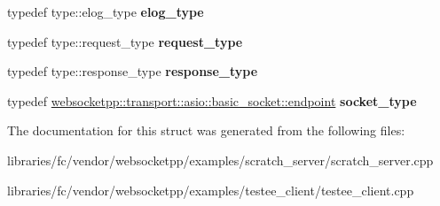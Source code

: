 \begin{DoxyCompactItemize}
typedef type\+::elog\+\_\+type {\bfseries elog\+\_\+type}
\item 
\mbox{\label{structdeflate__config_1_1transport__config_afcb4f1eb606485891239ea097aa8e728}} 
typedef type\+::request\+\_\+type {\bfseries request\+\_\+type}
\item 
\mbox{\label{structdeflate__config_1_1transport__config_adbecbb47a37c12ca234b81c6aa54969b}} 
typedef type\+::response\+\_\+type {\bfseries response\+\_\+type}
\item 
\mbox{\label{structdeflate__config_1_1transport__config_adfda46e87b835fdab210455dec3fbc40}} 
typedef \mbox{\hyperlink{classwebsocketpp_1_1transport_1_1asio_1_1basic__socket_1_1endpoint}{websocketpp\+::transport\+::asio\+::basic\+\_\+socket\+::endpoint}} {\bfseries socket\+\_\+type}
\end{DoxyCompactItemize}


The documentation for this struct was generated from the following files\+:\begin{DoxyCompactItemize}
\item 
libraries/fc/vendor/websocketpp/examples/scratch\+\_\+server/scratch\+\_\+server.\+cpp\item 
libraries/fc/vendor/websocketpp/examples/testee\+\_\+client/testee\+\_\+client.\+cpp\end{DoxyCompactItemize}
